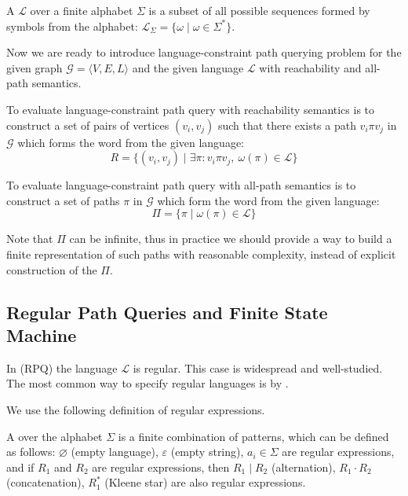 \begin{definition}
A  $\mathcal{L}$ over a finite alphabet $\Sigma$ is a subset of all possible sequences formed by symbols from the alphabet: $\mathcal{L}_{\Sigma} = \{\omega \mid \omega \in \Sigma^*\}$.
\end{definition}

Now we are ready to introduce language-constraint path querying problem for the given graph  $\mathcal{G} = \langle V,E,L \rangle$ and the given language $\mathcal{L}$ with reachability and all-path semantics.

\begin{definition}
To evaluate language-constraint path query with reachability semantics is to construct a set of pairs of vertices $(v_i,v_j)$ such that there exists a path $v_i \pi v_j$ in $\mathcal{G}$ which forms the word from the given language:
$$
R = \{(v_i,v_j) \mid \exists \pi: v_i \pi v_j, \ \omega(\pi) \in \mathcal{L} \}
$$
\end{definition}

\begin{definition}
To evaluate language-constraint path query with all-path semantics is to construct a set of paths $\pi$ in $\mathcal{G}$ which form the word from the given language:
$$
\Pi = \{ \pi \mid \omega(\pi) \in \mathcal{L}\}
$$
\end{definition}

Note that $\Pi$ can be infinite, thus in practice we should provide a way to build a finite representation of such paths with reasonable complexity, instead of explicit construction of the $\Pi$.

\subsection{Regular Path Queries and Finite State Machine}

In  (RPQ) the language $\mathcal{L}$ is regular.
This case is widespread and well-studied.
The most common way to specify regular languages is by .

We use the following definition of regular expressions.
\begin{definition}
A  over the alphabet $\Sigma$ is a finite combination of patterns, which can be defined as follows: $\varnothing$ (empty language), $\varepsilon$ (empty string), $a_i \in \Sigma$ are regular expressions, and if $R_1$ and $R_2$ are regular expressions, then $R_1 \mid R_2$ (alternation), $R_1 \cdot R_2$ (concatenation), $R_1^*$ (Kleene star) are also regular expressions.
\end{definition}

